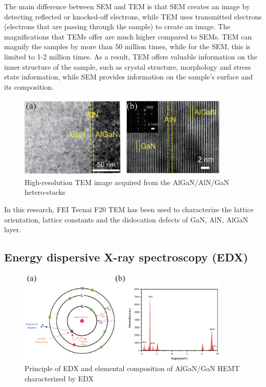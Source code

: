 The main difference between SEM and TEM is that SEM creates an image by detecting reflected or knocked-off electrons, while TEM uses transmitted electrons (electrons that are passing through the sample) to create an image. The magnifications that TEMs offer are much higher compared to SEMs. TEM can magnify the samples by more than 50 million times, while for the SEM, this is limited to 1-2 million times. As a result, TEM offers valuable information on the inner structure of the sample, such as crystal structure, morphology and stress state information, while SEM provides information on the sample’s surface and its composition.

\begin{figure}[ht] 
\centering    
\includegraphics[width=0.9\textwidth]{TEMGaN}
\caption[High-resolution TEM image acquired from the AlGaN/AlN/GaN hetero-stacks]{High-resolution TEM image acquired from the AlGaN/AlN/GaN hetero-stacks}
\label{fig:temGaN}
\end{figure}

In this research, FEI Tecnai F20 TEM has been used to characterize the lattice orientation, lattice constants  and the dislocation defects of GaN, AlN, AlGaN layer.

\subsection{Energy dispersive X-ray spectroscopy (EDX)}

\begin{figure}[H] 
\centering    
\includegraphics[width=0.9\textwidth]{edx}
\caption[Principle of EDX and elemental composition of AlGaN/GaN HEMT characterized by EDX]{Principle of EDX and elemental composition of AlGaN/GaN HEMT characterized by EDX}
\label{fig:edx}
\end{figure}

